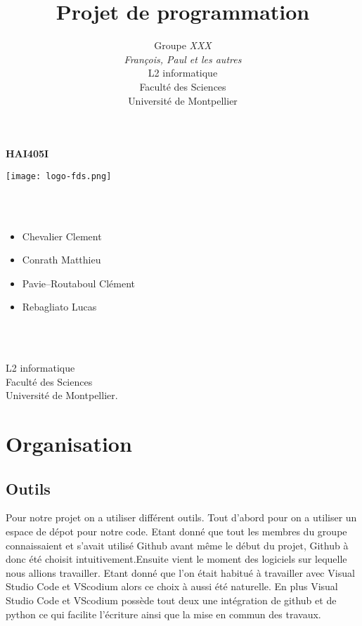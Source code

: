 \documentclass[a4paper, 12pt]{article}
\title{         %
  Projet de programmation}
\author{Groupe \emph{XXX}\\
  \emph{François, Paul et les autres}\\
    L2 informatique\\
  Faculté des Sciences\\
Université de Montpellier}
\begin{document}
\centerline{\Huge\bf HAI405I}
\vspace*{1.5cm}
\begin{center}               %
	
	
  \texttt{[image: logo-fds.png]}   %
	

\end{center}
\vspace*{1.5cm}


\vspace*{1.5cm}

\\ \\

\begin{itemize}\large
\item Chevalier Clement\large
\item Conrath Matthieu\large
\item Pavie--Routaboul Clément\large
\item Rebagliato Lucas\large
\end{itemize}
\\
\\
\vspace*{1.5cm}
\begin{center}
  L2 informatique\\
  Faculté des Sciences\\
Université de Montpellier.
\end{center}

\newpage

\section{Organisation}

\subsection{Outils}
Pour notre projet on a utiliser différent outils. Tout d'abord pour on a 
utiliser un espace de dépot pour notre code. Etant donné que tout les membres 
du groupe
connaissaient et s'avait utilisé Github avant même le début du projet, 
Github à donc été choisit intuitivement.Ensuite vient le moment des logiciels 
sur lequelle nous
allions travailler. Etant donné que l'on était habitué à travailler avec 
Visual Studio Code et VScodium alors ce choix à aussi été naturelle. 
En plus Visual Studio
Code et VScodium possède tout deux une intégration de github et de python ce 
qui facilite l'écriture ainsi que la mise en commun des travaux.
\end{document}
